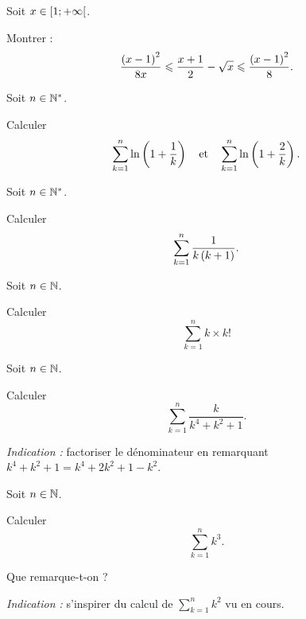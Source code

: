 \begin{exo}[Exercice 3]
Soit \(x\in\left[1;+\infty\right[\).

Montrer : \[\dfrac{\left(x-1\right)^2}{8x}\leqslant\dfrac{x+1}{2}-\sqrt{x}\leqslant\dfrac{\left(x-1\right)^2}{8}.\]
\end{exo}

\begin{corr}
\end{corr}

\begin{exo}[Exercice 4]
Soit \(n\in\mathbb{N}^*\).

Calculer \[\sum_{k=1}^n\ln\left(1+\dfrac{1}{k}\right)\quad\text{et}\quad\sum_{k=1}^{n}\ln\left(1+\dfrac{2}{k}\right).\]
\end{exo}

\begin{corr}
\end{corr}

\begin{exo}[Exercice 5]
Soit \(n\in\mathbb{N}^*\).

Calculer \[\sum_{k=1}^{n}\dfrac{1}{k\left(k+1\right)}.\]
\end{exo}

\begin{corr}
\end{corr}

\begin{exo}[Exercice 6]
Soit \(n\in\mathbb{N}\).

Calculer \[\sum_{k=1}^{n}k\times k!\]
\end{exo}

\begin{corr}
\end{corr}

\begin{exo}[Exercice 7]
Soit \(n\in\mathbb{N}\).

Calculer \[\sum_{k=1}^{n}\dfrac{k}{k^4+k^2+1}.\]

\textit{Indication :} factoriser le dénominateur en remarquant \(k^4+k^2+1=k^4+2k^2+1-k^2\).
\end{exo}

\begin{corr}
\end{corr}

\begin{exo}[Exercice 8]
Soit \(n\in\mathbb{N}\).

Calculer \[\sum_{k=1}^{n}k^3.\]

Que remarque-t-on ?

\textit{Indication :} s'inspirer du calcul de \(\sum_{k=1}^{n}k^2\) vu en cours.
\end{exo}


